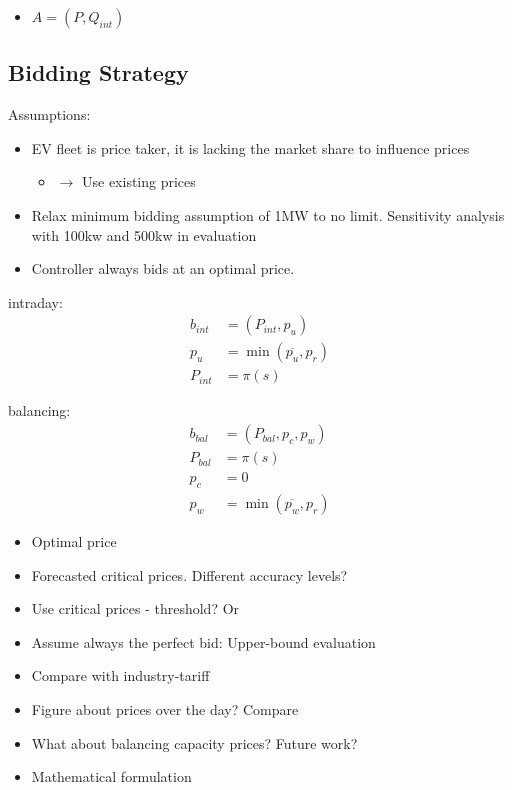 \documentclass[a4paper, 12pt]{article}
\begin{document}
\begin{itemize}
\item \(A = (P, Q_{int})\)
\end{itemize}
\subsection{Bidding Strategy \label{sec-model-bidding-strategy}}
\label{sec:orge60ce44}
Assumptions:
\begin{itemize}
\item EV fleet is price taker, it is lacking the market share to influence prices
\begin{itemize}
\item \(\rightarrow\) Use existing prices
\end{itemize}
\item Relax minimum bidding assumption of 1MW to no limit. Sensitivity analysis
with 100kw and 500kw in evaluation
\item Controller always bids at an optimal price.
\end{itemize}

intraday:
\begin{equation}
\begin{split}
    b_{int} &= (P_{int}, p_u) \\
    p_u &= \min(\overline{p_u}, p_r) \\
    P_{int} &= \pi(s)
\end{split}
\end{equation}

balancing:
\begin{equation}
\begin{split}
    b_{bal} &= (P_{bal}, p_c, p_w) \\
    P_{bal} &= \pi(s) \\
    p_c &= 0 \\
    p_w &= \min(\overline{p_w}, p_r)
\end{split}
\end{equation}

\begin{itemize}
\item Optimal price
\item Forecasted critical prices. Different accuracy levels?
\item Use critical prices - threshold? Or
\item Assume always the perfect bid: Upper-bound evaluation
\item Compare with industry-tariff
\item Figure about prices over the day? Compare
\item What about balancing capacity prices? Future work?
\item Mathematical formulation
\end{itemize}
\end{document}
